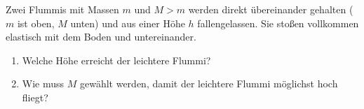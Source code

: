 \begin{Exercise}[label = Flummis, origin = 4. Runde zur 44. IPhO 2013 , difficulty = 3, title = Flummis]
Zwei Flummis mit Massen $m$ und $M>m$ werden direkt übereinander gehalten ($m$ ist oben, $M$ unten) und aus einer Höhe $h$
fallengelassen. Sie stoßen vollkommen elastisch mit dem Boden und untereinander.
\begin{enumerate}
\item Welche Höhe erreicht der leichtere Flummi?
\item Wie muss $M$ gewählt werden, damit der leichtere Flummi möglichst hoch fliegt?
\end{enumerate}  
\end{Exercise}